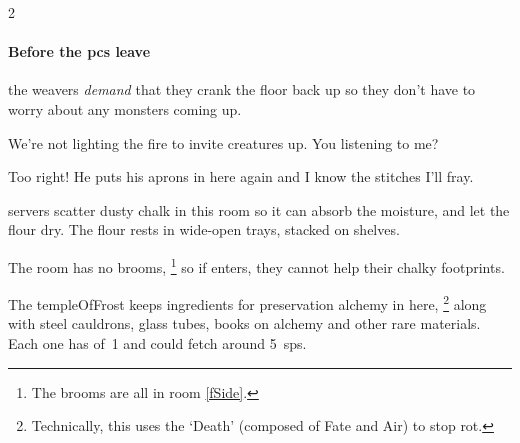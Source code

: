 \begin{multicols}{2}
\paragraph{Before the \glspl{pc} leave}
the \glspl{weaver} \emph{demand} that they crank the floor back up so they don't have to worry about any \glspl{monster} coming up.

\begin{speechtext}
  We're not lighting the fire to invite creatures up.
  You listening to me?

  \vspace{-.4em}

  \vspace{-.4em}

  \vspace{-.3em}


  Too right!
  He puts his aprons in here again and I know the stitches I'll fray.

  \vspace{-.3em}

  \vspace{-.3em}

\end{speechtext}


\Glspl{server} scatter dusty chalk in this room so it can absorb the moisture, and let the flour dry.
The flour rests in wide-open trays, stacked on shelves.

The room has no brooms,%
\footnote{The brooms are all in room \vref{fSide}.}
so if  enters, they cannot help their chalky footprints.


The \gls{templeOfFrost} keeps \glspl{ingredient} for preservation \gls{alchemy} in here,
\footnote{Technically, this uses the `Death'  (composed of Fate and Air) to stop rot.}
along with steel cauldrons, glass tubes, books on \gls{alchemy} and other rare materials.
Each one has  of~1 and could fetch around 5~\glspl{sp}.


\end{multicols}
